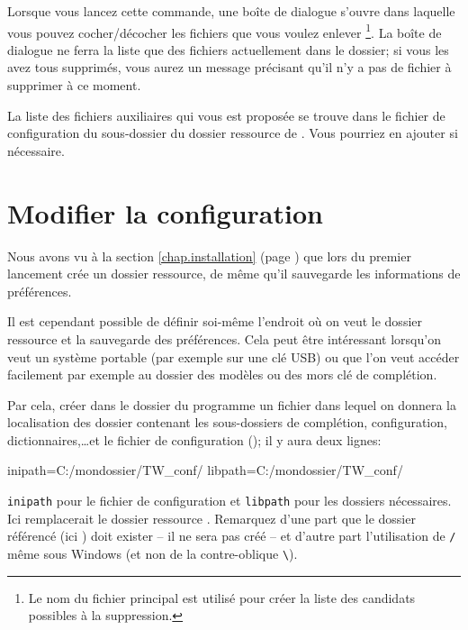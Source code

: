 Lorsque vous lancez cette commande, une boîte de dialogue s'ouvre dans laquelle vous pouvez cocher/décocher les fichiers que vous voulez enlever \footnote{Le nom du fichier principal est utilisé pour créer la liste des candidats possibles à la suppression.}. La boîte de dialogue ne ferra la liste que des fichiers actuellement dans le dossier; si vous les avez tous supprimés, vous aurez un message précisant qu'il n'y a pas de fichier à supprimer à ce moment.

La liste des fichiers auxiliaires qui vous est proposée se trouve dans le fichier de configuration  du sous-dossier  du dossier ressource de \Tw. Vous pourriez en ajouter si nécessaire.

\section{Modifier la configuration}

Nous avons vu à la section \ref{chap.installation} (page \pageref{chap.installation}) que lors du premier lancement \Tw{} crée un dossier ressource, de même qu'il sauvegarde les informations de préférences.

Il est cependant possible de définir soi-même l'endroit où on veut le dossier ressource et la sauvegarde des préférences. Cela peut être intéressant lorsqu'on veut un système portable (par exemple sur une clé USB) ou que l'on veut accéder facilement par exemple au dossier des modèles ou des mors clé de complétion.

Par cela, créer dans le dossier du programme un fichier  dans lequel on donnera la localisation des dossier contenant les sous-dossiers de complétion, configuration, dictionnaires,\dots et le fichier de configuration (); il y aura deux lignes:
\begin{verbExample}
inipath=C:/mondossier/TW_conf/
libpath=C:/mondossier/TW_conf/
\end{verbExample}

\verb|inipath| pour le fichier de configuration et \verb|libpath| pour les dossiers nécessaires. Ici  remplacerait le dossier ressource . Remarquez d'une part que le dossier référencé (ici ) doit exister -- il ne sera pas créé -- et d'autre part l'utilisation de \verb|/| même sous Windows (et non de la contre-oblique \verb+\+).


